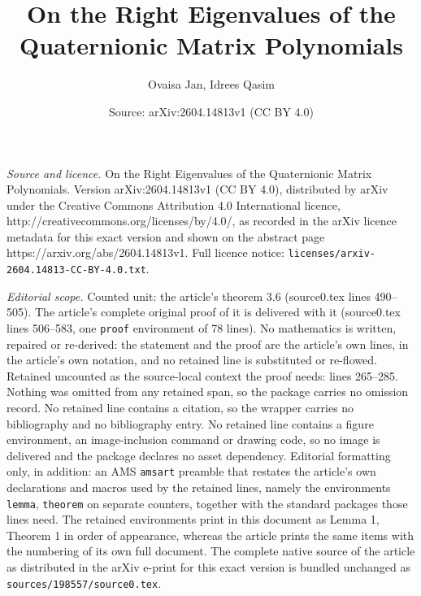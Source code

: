 \documentclass[10pt,a4paper]{amsart}
\title{On the Right Eigenvalues of the Quaternionic Matrix Polynomials}
\author{Ovaisa Jan, Idrees Qasim}
\date{Source: arXiv:2604.14813v1 (CC BY 4.0)}
\begin{document}
\maketitle

\noindent\emph{Source and licence.} On the Right Eigenvalues of the Quaternionic Matrix Polynomials. Version arXiv:2604.14813v1 (CC BY 4.0), distributed by arXiv under the Creative Commons Attribution 4.0 International licence, http://creativecommons.org/licenses/by/4.0/, as recorded in the arXiv licence metadata for this exact version and shown on the abstract page https://arxiv.org/abs/2604.14813v1. Full licence notice: \texttt{licenses/arxiv-2604.14813-CC-BY-4.0.txt}.\par\smallskip

\noindent\textit{Editorial scope.} Counted unit: the article's theorem 3.6 (source0.tex lines 490--505). The article's complete original proof of it is delivered with it (source0.tex lines 506--583, one \texttt{proof} environment of 78 lines). No mathematics is written, repaired or re-derived: the statement and the proof are the article's own lines, in the article's own notation, and no retained line is substituted or re-flowed.  Retained uncounted as the source-local context the proof needs: lines 265--285.  Nothing was omitted from any retained span, so the package carries no omission record.  No retained line contains a citation, so the wrapper carries no bibliography and no bibliography entry.  No retained line contains a figure environment, an image-inclusion command or drawing code, so no image is delivered and the package declares no asset dependency.  Editorial formatting only, in addition: an AMS \texttt{amsart} preamble that restates the article's own declarations and macros used by the retained lines, namely the environments \texttt{lemma}, \texttt{theorem} on separate counters, together with the standard packages those lines need.  The retained environments print in this document as Lemma 1, Theorem 1 in order of appearance, whereas the article prints the same items with the numbering of its own full document.  The complete native source of the article as distributed in the arXiv e-print for this exact version is bundled unchanged as \texttt{sources/198557/source0.tex}.
\end{document}

